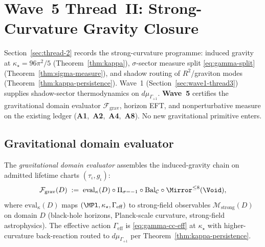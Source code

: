 \section{Wave~5 Thread~II: Strong-Curvature Gravity Closure}
\label{sec:wave5-thread2}

Section~\ref{sec:thread-2} records the strong-curvature programme: induced
gravity at $\kappa_\star=96\pi^2/5$ (Theorem~\ref{thm:kappa}),
$\sigma$-sector measure split \eqref{eq:gamma-split}
(Theorem~\ref{thm:sigma-measure}), and shadow routing of $R^2$/graviton modes
(Theorem~\ref{thm:kappa-persistence}). Wave~1 (Section~\ref{sec:wave1-thread3})
supplies shadow-sector thermodynamics on $d\mu_{\Gamma_{+1}}$.
\textbf{Wave~5} certifies the gravitational domain evaluator
$\mathcal{F}_{\mathrm{grav}}$, horizon EFT, and nonperturbative measure on the
existing ledger (\textbf{A1},~\textbf{A2},~\textbf{A4},~\textbf{A8}). No new
gravitational primitive enters.

\subsection{Gravitational domain evaluator}
\label{sec:wave5-thread2:evaluator}

\begin{definition}
\label{def:thread-2-evaluator}
The \emph{gravitational domain evaluator} assembles the induced-gravity chain
on admitted lifetime charts $(\tau_\iota,g_\iota)$:
\begin{equation}\label{eq:thread2-evaluator}
  \mathcal{F}_{\mathrm{grav}}(D)
  \;:=\;
  \mathrm{eval}_\kappa(D)
  \circ
  \Pi_{\sigma=-1}
  \circ
  \mathrm{Bal}_{\mathcal{C}}
  \circ
  \Mirror^{\leq 8}(\Void),
\end{equation}
where $\mathrm{eval}_\kappa(D)$ maps
$(\MPl,\kappa_\star,\Gamma_{\mathrm{eff}})$ to strong-field observables
$\mathcal{M}_{\mathrm{strong}}(D)$ on domain $D$ (black-hole horizons,
Planck-scale curvature, strong-field astrophysics). The effective action
$\Gamma_{\mathrm{eff}}$ is \eqref{eq:gamma-cc-eff} at $\kappa_\star$ with
higher-curvature back-reaction routed to $d\mu_{\Gamma_{+1}}$ per
Theorem~\ref{thm:kappa-persistence}.
\end{definition}

